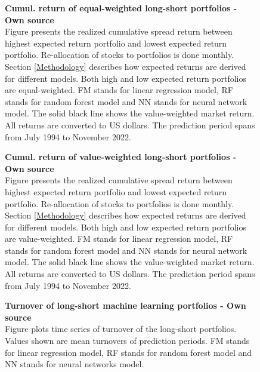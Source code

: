 \documentclass[12pt]{article}
\begin{document}
\begin{appendices}
\begin{figure}[H]
\centering
\caption[Cumulative return of equal-weighted long-short portfolios]{\textbf{Cumul. return of equal-weighted long-short portfolios \textnormal{- Own source}}\\ Figure presents the realized cumulative spread return between highest expected return portfolio and lowest expected return portfolio. Re-allocation of stocks to portfolios is done monthly. Section \ref{Methodology} describes how expected returns are derived for different models. Both high and low expected return portfolios are equal-weighted. FM stands for linear regression model, RF stands for random forest model and NN stands for neural network model. The solid black line shows the value-weighted market return. All returns are converted to US dollars. The prediction period spans from July 1994 to November 2022.}

\label{plot:cumul_ew_LS_portf_return}
\end{figure}

\begin{figure}[H]
\centering
\caption[Cumulative return of value-weighted long-short portfolios]{\textbf{Cumul. return of value-weighted long-short portfolios \textnormal{- Own source}}\\ Figure presents the realized cumulative spread return between highest expected return portfolio and lowest expected return portfolio. Re-allocation of stocks to portfolios is done monthly. Section \ref{Methodology} describes how expected returns are derived for different models. Both high and low expected return portfolios are value-weighted. FM stands for linear regression model, RF stands for random forest model and NN stands for neural network model. The solid black line shows the value-weighted market return. All returns are converted to US dollars. The prediction period spans from July 1994 to November 2022.}

\label{plot:cumul_vw_LS_portf_return}
\end{figure}

\begin{figure}[H]
\centering
\caption[Turnover of long-short machine learning portfolios]{\textbf{Turnover of long-short machine learning portfolios \textnormal{- Own source}}\\ Figure plots time series of turnover of the long-short portfolios. Values shown are mean turnovers of prediction periods. FM stands for linear regression model, RF stands for random forest model and NN stands for neural networks model. }

\label{plot:Turnover}
\end{figure}


\end{appendices}
\end{document}
